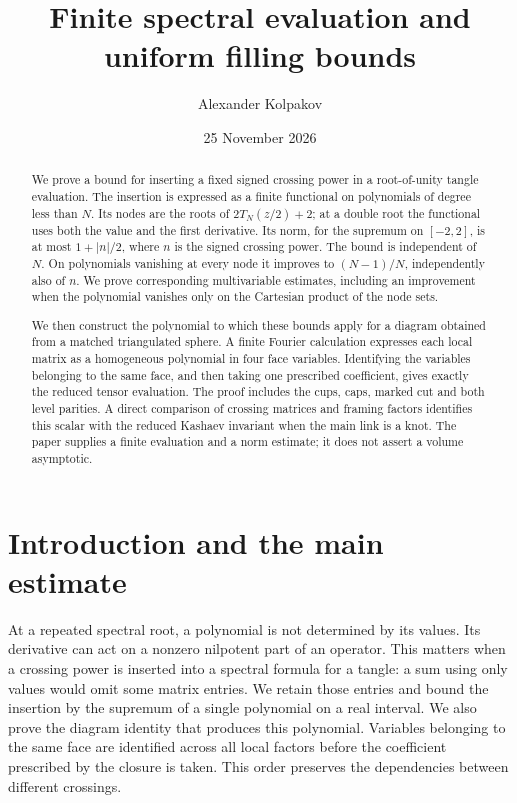 \documentclass[11pt]{article}
\title{Finite spectral evaluation and uniform filling bounds}
\author{Alexander Kolpakov}
\date{25 November 2026}
\numberwithin{equation}{section}
\theoremstyle{definition}\newtheorem{definition}[theorem]{Definition}
\theoremstyle{remark}\newtheorem{remark}[theorem]{Remark}
\begin{document}
\maketitle
\begin{abstract}
We prove a bound for inserting a fixed signed crossing power in a
root-of-unity tangle evaluation. The insertion is expressed as a finite
functional on polynomials of degree less than $N$. Its nodes are the
roots of $2T_N(z/2)+2$; at a double root the functional uses both the
value and the first derivative. Its norm, for the supremum on $[-2,2]$,
is at most $1+|n|/2$, where $n$ is the signed crossing power. The bound
is independent of $N$. On polynomials vanishing at every node it
improves to $(N-1)/N$, independently also of $n$. We prove corresponding
multivariable estimates, including an improvement when the polynomial
vanishes only on the Cartesian product of the node sets.

We then construct the polynomial to which these bounds apply for a
diagram obtained from a matched triangulated sphere. A finite Fourier
calculation expresses each local matrix as a homogeneous polynomial
in four face variables. Identifying the variables belonging to the same
face, and then taking one prescribed coefficient, gives exactly the
reduced tensor evaluation. The proof includes the cups, caps, marked
cut and both level parities. A direct comparison of crossing matrices
and framing factors identifies this scalar with the reduced Kashaev
invariant when the main link is a knot. The paper supplies a finite
evaluation and a norm estimate; it does not assert a volume asymptotic.
\end{abstract}

\section{Introduction and the main estimate}

At a repeated spectral root, a polynomial is not determined by its
values. Its derivative can act on a nonzero nilpotent part of an
operator. This matters when a crossing power is inserted into a
spectral formula for a tangle: a sum using only values would omit some
matrix entries. We retain those entries and bound the insertion by
the supremum of a single polynomial on a real interval. We also prove
the diagram identity that produces this polynomial. Variables belonging
to the same face are identified across all local factors before the
coefficient prescribed by the closure is taken. This order preserves
the dependencies between different crossings.
\end{document}
